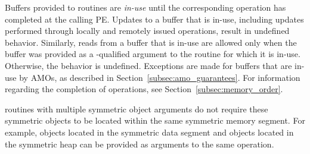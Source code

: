Buffers provided to \openshmem routines are \emph{in-use} until the
corresponding \openshmem operation has completed at the calling \ac{PE}.
Updates to a buffer that is in-use, including updates performed through locally
and remotely issued \openshmem operations, result in undefined behavior.
Similarly, reads from a buffer that is in-use are allowed only when the buffer
was provided as a -qualified argument to the \openshmem routine for
which it is in-use.  Otherwise, the behavior is undefined. Exceptions are made for
buffers that are in-use by \acp{AMO}, as described in
Section~\ref{subsec:amo_guarantees}. For information regarding the completion
of \openshmem operations, see Section~\ref{subsec:memory_order}.

\openshmem routines with multiple symmetric object arguments do not require
these symmetric objects to be located within the same symmetric memory segment.
For example, objects located in the symmetric data segment and objects located
in the symmetric heap can be provided as arguments to the same \openshmem
operation.
